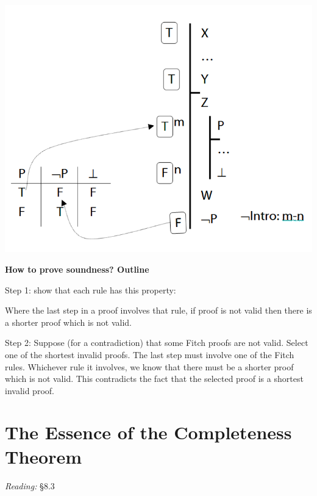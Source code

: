 \documentclass[12pt]{extarticle}
\begin{document}
\begin{multicols*}{3}
\begin{minipage}{\columnwidth}
\begin{center}
\includegraphics[scale=0.3]{img/soundness_not.png}
\end{center}
\end{minipage}
 
\begin{minipage}{\columnwidth}
 
\textbf{How to prove soundness? Outline}
 
Step 1: show that each rule has this property:
 
\hspace{5mm} Where the last step in a proof involves that rule, if proof is not valid then there is a shorter proof which is not valid.
 
Step 2: Suppose (for a contradiction) that some Fitch proofs are not valid. Select one of the shortest invalid proofs. The last step must involve one of the Fitch rules. Whichever rule it involves, we know that there must be a shorter proof which is not valid. This contradicts the fact that the selected proof is a shortest invalid proof.
 
\end{minipage}
 
 
 
\section{The Essence of the Completeness Theorem}
 
\emph{Reading:} §8.3
 

\end{multicols*}
\end{document}
